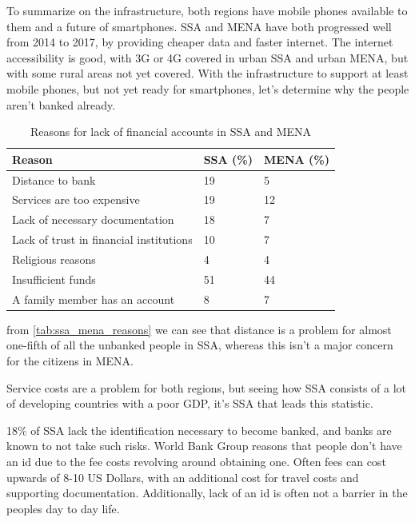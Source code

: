 \documentclass[11pt, a4paper]{article}
\begin{document}
To summarize on the infrastructure, both regions have mobile phones available to them and a future of smartphones. SSA and MENA have both progressed well from 2014 to 2017, by providing cheaper data and faster internet. The internet accessibility is good, with 3G or 4G covered in urban SSA and urban MENA, but with some rural areas not yet covered. With the infrastructure to support at least mobile phones, but not yet ready for smartphones, let's determine why the people aren't banked already.

\begin{table}[!ht]
\centering
\begin{tabular}{|l|l|l|}
\hline
\textbf{Reason} & \textbf{SSA (\%)} & \textbf{MENA (\%)} \\ \hline
Distance to bank & 19 & 5 \\ \hline
Services are too expensive & 19 & 12 \\ \hline
Lack of necessary documentation & 18 & 7 \\ \hline
Lack of trust in financial institutions & 10 & 7 \\ \hline
Religious reasons & 4 & 4 \\ \hline
Insufficient funds & 51 & 44 \\ \hline
A family member has an account & 8 & 7\\ \hline
\end{tabular}
\caption{Reasons for lack of financial accounts in SSA and MENA\cite{gfindex}}
\label{tab:ssa_mena_reasons}
\end{table}

from \autoref{tab:ssa_mena_reasons} we can see that distance is a problem for almost one-fifth of all the unbanked people in SSA, whereas this isn't a major concern for the citizens in MENA.

Service costs are a problem for both regions, but seeing how SSA consists of a lot of developing countries with a poor GDP, it's SSA that leads this statistic.

18\% of SSA lack the identification necessary to become banked, and banks are known to not take such risks. World Bank Group\cite{worldbankid} reasons that people don't have an id due to the fee costs revolving around obtaining one. Often fees can cost upwards of 8-10 US Dollars\cite{worldbankid}, with an additional cost for travel costs and supporting documentation\cite{worldbankid}. Additionally, lack of an id is often not a barrier in the peoples day to day life\cite{worldbankid}.
\end{document}
